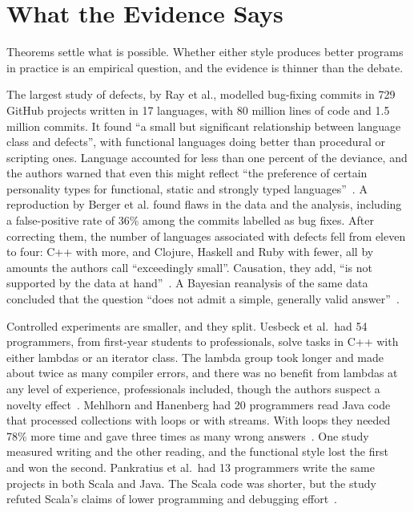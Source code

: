 \documentclass[11pt]{article}
\let\oldsection\section
\renewcommand{\section}{\Needspace{0.25\textheight}\oldsection}
\theoremstyle{definition}
\theoremstyle{remark}
\begin{document}
\section{What the Evidence Says}\label{sec:evidence}

Theorems settle what is possible. Whether either style produces better
programs in practice is an empirical question, and the evidence is
thinner than the debate.

The largest study of defects, by Ray et al., modelled bug-fixing commits
in 729 GitHub projects written in 17 languages, with 80 million lines of
code and 1.5 million commits. It found ``a small but significant
relationship between language class and defects'', with functional
languages doing better than procedural or scripting ones. Language
accounted for less than one percent of the deviance, and the authors
warned that even this might reflect ``the preference of certain
personality types for functional, static and strongly typed
languages''~\cite{ray}. A reproduction by Berger et al. found flaws in
the data and the analysis, including a false-positive rate of 36\% among
the commits labelled as bug fixes. After correcting them, the number of
languages associated with defects fell from eleven to four: C++ with
more, and Clojure, Haskell and Ruby with fewer, all by amounts the
authors call ``exceedingly small''. Causation, they add, ``is not
supported by the data at hand''~\cite{berger}. A Bayesian reanalysis of
the same data concluded that the question ``does not admit a simple,
generally valid answer''~\cite{furia}.

Controlled experiments are smaller, and they split. Uesbeck et al.\ had
54 programmers, from first-year students to professionals, solve tasks
in C++ with either lambdas or an iterator class. The lambda group took
longer and made about twice as many compiler errors, and there was no
benefit from lambdas at any level of experience, professionals included,
though the authors suspect a novelty effect~\cite{uesbeck}. Mehlhorn and
Hanenberg had 20 programmers read Java code that processed collections
with loops or with streams. With loops they needed 78\% more time and
gave three times as many wrong answers~\cite{mehlhorn}. One study
measured writing and the other reading, and the functional style lost
the first and won the second. Pankratius et al.\ had 13 programmers write
the same projects in both Scala and Java. The Scala code was shorter, but
the study refuted Scala's claims of lower programming and debugging
effort~\cite{pankratius}.
\end{document}
